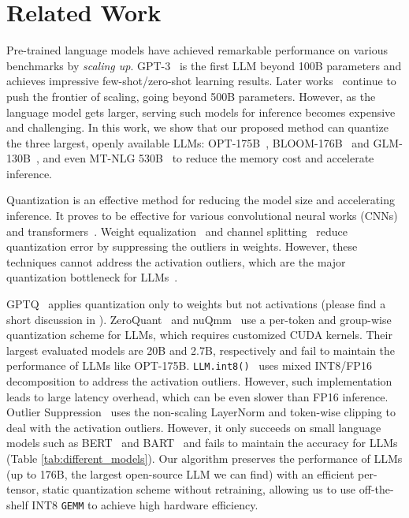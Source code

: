 \section{Related Work}
Pre-trained language models have achieved remarkable performance on various benchmarks by \emph{scaling up}.
GPT-3~\cite{brown2020language} is the first LLM beyond 100B parameters and achieves impressive few-shot/zero-shot learning results. Later works~\cite{rae2021scaling,smith2022using,du2022glam,chowdhery2022palm}  continue to push the frontier of scaling, going beyond 500B parameters.
However, as the language model gets larger, serving such models for inference becomes expensive and challenging. In this work, we show that our proposed method can quantize the three largest, openly available LLMs: OPT-175B~\cite{opt}, BLOOM-176B~\cite{scao2022bloom} and GLM-130B~\cite{zeng2022glm}, and even MT-NLG 530B~\cite{smith2022using} to reduce the memory cost and accelerate inference.

Quantization is an effective method for reducing the model size and accelerating inference. It proves to be effective for various convolutional neural works (CNNs)~\cite{han2016deep,  jacob2018quantization, nagel2019data, wang2019haq, lin2020mcunet} and transformers~\cite{shen2020q, kim2021bert, liu2021post,spatten,bondarenko2021understanding}. Weight equalization~\cite{nagel2019data} and channel splitting~\cite{zhao2019improving} reduce quantization error by suppressing the outliers in weights. However, these techniques cannot address the activation outliers, which are the major quantization bottleneck for LLMs~\cite{dettmers2022llmint8}.

GPTQ~\cite{frantar2022gptq} applies quantization only to weights but not activations (please find a short discussion in ).
ZeroQuant~\cite{zeroquant} and nuQmm~\cite{park2022nuqmm} use a per-token and group-wise quantization scheme for LLMs, which requires customized CUDA kernels. Their largest evaluated models are 20B and 2.7B, respectively and fail to maintain the performance of LLMs like OPT-175B.
\texttt{LLM.int8()}~\cite{dettmers2022llmint8} uses mixed INT8/FP16 decomposition to address the activation outliers. However, such implementation leads to large latency overhead, which can be even slower than FP16 inference. Outlier Suppression~\cite{outlier_suppression} uses the non-scaling LayerNorm and token-wise clipping to deal with the activation outliers. However, it only succeeds on small language models such as BERT~\cite{bert} and BART~\cite{lewis2019bart} and fails to  maintain the accuracy for LLMs (Table \ref{tab:different_models}).
Our algorithm preserves the performance of LLMs (up to 176B, the largest open-source LLM we can find) with an efficient per-tensor, static quantization scheme without retraining, allowing us to use off-the-shelf INT8 \texttt{GEMM} to achieve high hardware efficiency.
